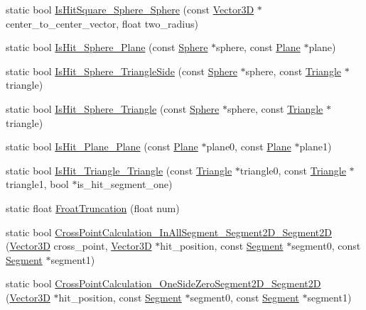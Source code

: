 \begin{DoxyCompactItemize}
\item 
static bool \mbox{\hyperlink{class_collision_judgment_ae67e650c3a7b610a6bafaef3f17dadeb}{Is\+Hit\+Square\+\_\+\+Sphere\+\_\+\+Sphere}} (const \mbox{\hyperlink{class_vector3_d}{Vector3D}} $\ast$center\+\_\+to\+\_\+center\+\_\+vector, float two\+\_\+radius)
\item 
static bool \mbox{\hyperlink{class_collision_judgment_a7ec99cbf152e28907e2770ed44a7cefa}{Is\+Hit\+\_\+\+Sphere\+\_\+\+Plane}} (const \mbox{\hyperlink{class_sphere}{Sphere}} $\ast$sphere, const \mbox{\hyperlink{class_plane}{Plane}} $\ast$plane)
\item 
static bool \mbox{\hyperlink{class_collision_judgment_a1bd97fffa0335f66531ba624c3beccda}{Is\+Hit\+\_\+\+Sphere\+\_\+\+Triangle\+Side}} (const \mbox{\hyperlink{class_sphere}{Sphere}} $\ast$sphere, const \mbox{\hyperlink{class_triangle}{Triangle}} $\ast$triangle)
\item 
static bool \mbox{\hyperlink{class_collision_judgment_a3a594014c7ee4ba7adae21f2da9c7612}{Is\+Hit\+\_\+\+Sphere\+\_\+\+Triangle}} (const \mbox{\hyperlink{class_sphere}{Sphere}} $\ast$sphere, const \mbox{\hyperlink{class_triangle}{Triangle}} $\ast$triangle)
\item 
static bool \mbox{\hyperlink{class_collision_judgment_a549042895226422e8551afff35519a59}{Is\+Hit\+\_\+\+Plane\+\_\+\+Plane}} (const \mbox{\hyperlink{class_plane}{Plane}} $\ast$plane0, const \mbox{\hyperlink{class_plane}{Plane}} $\ast$plane1)
\item 
static bool \mbox{\hyperlink{class_collision_judgment_a96728b80c578cd9566677788b5e5fad8}{Is\+Hit\+\_\+\+Triangle\+\_\+\+Triangle}} (const \mbox{\hyperlink{class_triangle}{Triangle}} $\ast$triangle0, const \mbox{\hyperlink{class_triangle}{Triangle}} $\ast$triangle1, bool $\ast$is\+\_\+hit\+\_\+segment\+\_\+one)
\item 
static float \mbox{\hyperlink{class_collision_judgment_a76fe4aa5e6400073823c1f60395c1f94}{Froat\+Truncation}} (float num)
\item 
static bool \mbox{\hyperlink{class_collision_judgment_a93ec7cb67dde5798661d14c52272dc99}{Cross\+Point\+Calculation\+\_\+\+In\+All\+Segment\+\_\+\+Segment2\+D\+\_\+\+Segment2D}} (\mbox{\hyperlink{class_vector3_d}{Vector3D}} cross\+\_\+point, \mbox{\hyperlink{class_vector3_d}{Vector3D}} $\ast$hit\+\_\+position, const \mbox{\hyperlink{class_segment}{Segment}} $\ast$segment0, const \mbox{\hyperlink{class_segment}{Segment}} $\ast$segment1)
\item 
static bool \mbox{\hyperlink{class_collision_judgment_aef83b0d1bff8ede9c3e1f836694a3153}{Cross\+Point\+Calculation\+\_\+\+One\+Side\+Zero\+Segment2\+D\+\_\+\+Segment2D}} (\mbox{\hyperlink{class_vector3_d}{Vector3D}} $\ast$hit\+\_\+position, const \mbox{\hyperlink{class_segment}{Segment}} $\ast$segment0, const \mbox{\hyperlink{class_segment}{Segment}} $\ast$segment1)

\end{DoxyCompactItemize}
